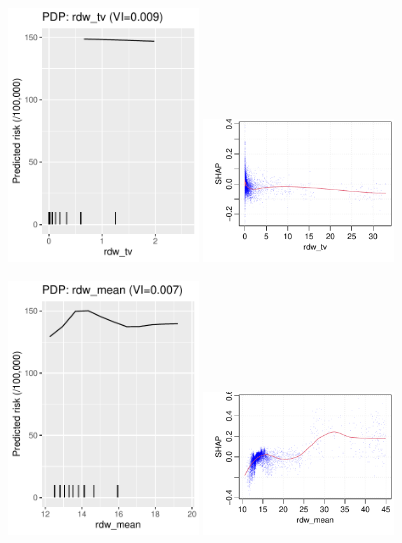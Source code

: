 \documentclass[12pt]{article}
\begin{document}
\begin{figure}[h]
\centering
\includegraphics[width=0.45\textwidth]{figures/pdp/rdw_tv.pdf}
\includegraphics[width=0.45\textwidth]{figures/shap/rdw_tv.pdf}
\end{figure}
\begin{figure}[h]
\centering
\includegraphics[width=0.45\textwidth]{figures/pdp/rdw_mean.pdf}
\includegraphics[width=0.45\textwidth]{figures/shap/rdw_mean.pdf}
\end{figure}
\end{document}
